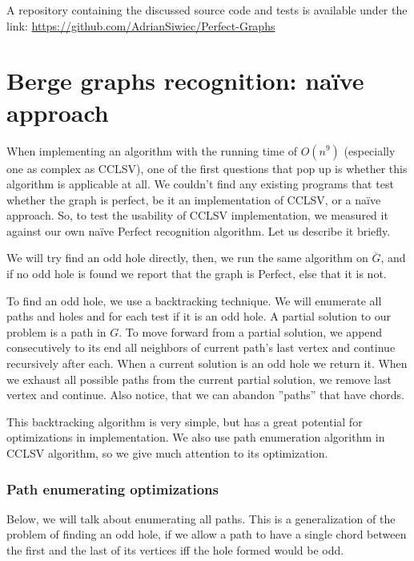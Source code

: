 A repository containing the discussed source code and tests is available under the link: \href{https://github.com/AdrianSiwiec/Perfect-Graphs}{https://github.com/AdrianSiwiec/Perfect-Graphs}

\section{Berge graphs recognition: na\"ive approach}
When implementing an algorithm with the running time of $O(n^9)$ (especially one as complex as CCLSV), one of the first questions that pop up is whether this algorithm is applicable at all. We couldn't find any existing programs that test whether the graph is perfect, be it an implementation of CCLSV, or a na\"ive approach. So, to test the usability of CCLSV implementation, we measured it against our own na\"ive Perfect recognition algorithm. Let us describe it briefly.

We will try find an odd hole directly, then, we run the same algorithm on $\overline{G}$, and if no odd hole is found we report that the graph is Perfect, else that it is not.

To find an odd hole, we use a backtracking technique. We will enumerate all paths and holes and for each test if it is an odd hole. A partial solution to our problem is a path in $G$. To move forward from a partial solution, we append consecutively to its end all neighbors of current path's last vertex and continue recursively after each. When a current solution is an odd hole we return it. When we exhaust all possible paths from the current partial solution, we remove last vertex and continue. Also notice, that we can abandon ''paths'' that have chords.

This backtracking algorithm is very simple, but has a great potential for optimizations in implementation. We also use path enumeration algorithm in CCLSV algorithm, so we give much attention to its optimization.

\subsubsection{Path enumerating optimizations}
Below, we will talk about enumerating all paths. This is a generalization of the problem of finding an odd hole, if we allow a path to have a single chord between the first and the last of its vertices iff the hole formed would be odd.

